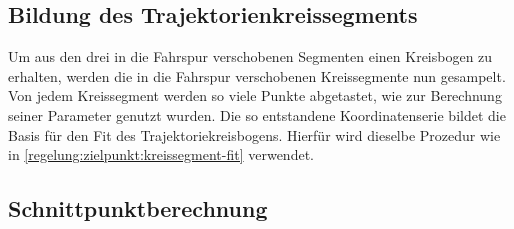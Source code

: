 \subsection{Bildung des Trajektorienkreissegments}
Um aus den drei in die Fahrspur verschobenen Segmenten einen Kreisbogen zu erhalten, werden die in die Fahrspur verschobenen Kreissegmente nun gesampelt. Von jedem Kreissegment werden so viele Punkte abgetastet, wie zur Berechnung seiner Parameter genutzt wurden. Die so entstandene Koordinatenserie bildet die Basis für den Fit des Trajektoriekreisbogens. Hierfür wird dieselbe Prozedur wie in  \ref{regelung:zielpunkt:kreissegment-fit} verwendet.

\subsection{Schnittpunktberechnung}

